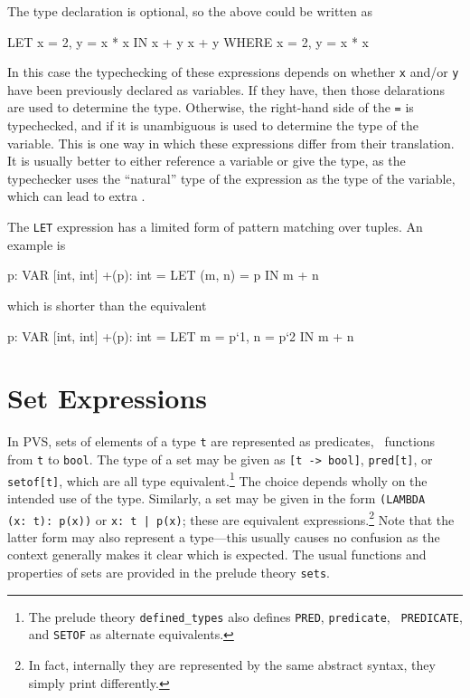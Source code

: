 The type declaration is optional, so the above could be written as
\begin{pvsex}
  LET x = 2, y = x * x IN x + y
  x + y WHERE x = 2, y = x * x
\end{pvsex}
In this case the typechecking of these expressions depends on whether
\texttt{x} and/or \texttt{y} have been previously declared as variables.
If they have, then those delarations are used to determine the type.
Otherwise, the right-hand side of the \texttt{=} is typechecked, and if it
is unambiguous is used to determine the type of the variable.  This is 
one way in which these expressions differ from their translation.
It is usually better to either reference a variable or give the type, as
the typechecker uses the ``natural'' type of the expression as the type of
the variable, which can lead to extra \tccs.

The \texttt{LET} expression has a limited form of pattern matching over
tuples.  An example is
\begin{pvsex}
  p: VAR [int, int]
  +(p): int = LET (m, n) = p IN m + n
\end{pvsex}
which is shorter than the equivalent
\begin{pvsex}
  p: VAR [int, int]
  +(p): int = LET m = p`1, n = p`2 IN m + n
\end{pvsex}


\section{Set Expressions}\label{set-exprs}

In PVS, sets of elements of a type \texttt{t} are represented as
predicates, \ie\ functions from \texttt{t} to \texttt{bool}.  The type of a
set may be given as \texttt{[t -> bool]}, \texttt{pred[t]}, or \texttt{
setof[t]}, which are all type equivalent.\footnote{The prelude theory
\texttt{defined\_types} also defines \texttt{PRED}, \texttt{predicate}, \texttt{
PREDICATE}, and \texttt{SETOF} as alternate equivalents.}
The choice depends wholly on the intended use of the type.
Similarly, a set may be given in the form \texttt{(LAMBDA (x:\ t):\
p(x))} or \texttt{\setb{}x:\ t | p(x)\sete}; these are equivalent
expressions.\footnote{In fact, internally they are represented by the
same abstract syntax, they simply print differently.} Note that the
latter form may also represent a type---this usually causes no
confusion as the context generally makes it clear which is expected.
The usual functions and properties of sets are provided in the prelude
theory \texttt{sets}.


